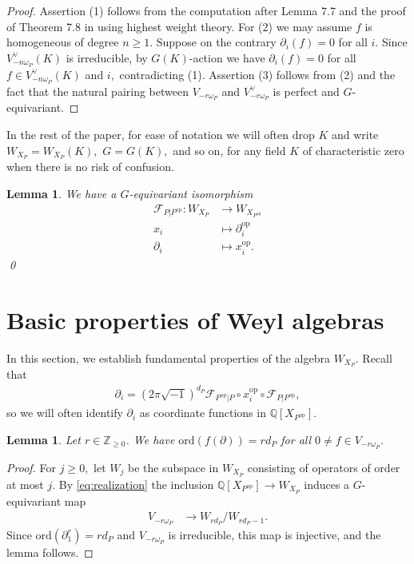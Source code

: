 \documentclass[11pt,a4paper,usenames,dvipsnames,reqno]{amsart}
\numberwithin{equation}{section}
\newcommand{\zz}{\mathbb Z}
\newcommand{\qq}{\mathbb Q}
\newtheorem{Lem}[Thm]{Lemma}
\theoremstyle{definition}
\theoremstyle{remark}
\begin{document}
\begin{proof}
    Assertion (1) follows from the computation after  Lemma 7.7 and the proof of Theorem 7.8 in \cite[\S 7.2]{Hsu:asymptotics} using highest weight theory. For (2) we may assume $f$ is homogeneous of degree $n\ge 1$. Suppose on the contrary $\partial_i(f)=0$ for all $i$. Since $V^{\lor}_{-n\omega_P}(K)$ is irreducible, by $G(K)$-action we have $\partial_i(f)=0$ for all $f\in V^{\lor}_{-n\omega_P}(K)$ and $i,$ contradicting (1). Assertion (3) follows from (2) and the fact that the natural pairing between $V_{-r\omega_P}$ and $V^\lor_{-r\omega_P}$ is perfect and $G$-equivariant.
\end{proof}


In the rest of the paper, for ease of notation we will often drop $K$ and write $W_{X_P}=W_{X_P}(K),$ $G=G(K),$ and so on, for any field $K$ of characteristic zero when there is no risk of confusion. 

\begin{Lem}\label{eq:Fourierauto}
We have a $G$-equivariant isomorphism
\begin{align*}
    \mathcal{F}_{P|P^{\mathrm{op}}}: W_{X_P}&\longrightarrow W_{X_{P^{\mathrm{op}}}}\\
    x_i&\mapsto \partial_i^{\mathrm{op}}\\
    \partial_i &\mapsto x_i^{\mathrm{op}}.
\end{align*}\qed
\end{Lem}




\section{Basic properties of Weyl algebras}\label{sec:basic}

In this section, we establish fundamental properties of the algebra $W_{X_P}$. Recall that 
\begin{align*}
    \partial_i=(2\pi\sqrt{-1})^{d_P}\mathcal{F}_{P^{\mathrm{op}}|P}\circ x_i^{\mathrm{op}}\circ\mathcal{F}_{P|P^{\mathrm{op}}},
\end{align*}
so we will often identify $\partial_i$ as coordinate functions in $\qq[X_{P^{\mathrm{op}}}].$

\begin{Lem}\label{lem:orderadd}
Let $r\in \zz_{\ge 0}$. We have $\mathrm{ord}(f(\partial))=rd_P$ for all $0\neq f\in V_{-r\omega_P}$.
\end{Lem}

\begin{proof}
      For $j\ge 0,$ let $W_j$ be the subspace in $W_{X_P}$ consisting of operators of order at most $j$. By \eqref{eq:realization} the inclusion $\qq[X_{P^{\mathrm{op}}}]\longrightarrow W_{X_P}$ induces a $G$-equivariant map 
     \begin{align*}
         V_{-r\omega_P}&\longrightarrow W_{rd_P}/W_{rd_P-1}.
     \end{align*}
     Since $\mathrm{ord} (\partial_1^r)=rd_P$ and  $V_{-r\omega_P}$ is irreducible, this map is injective, and the lemma follows.
\end{proof}
\end{document}

